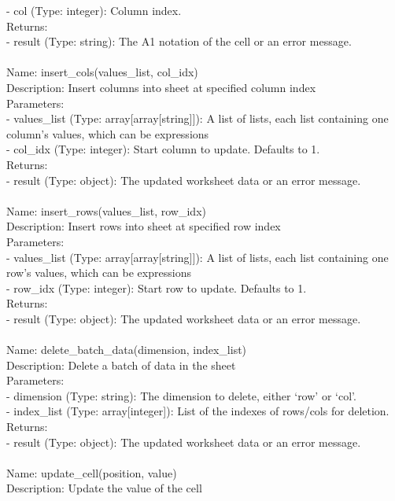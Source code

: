 \begin{tcolorbox}[breakable,title=Prompt Details for Sheet]
- col (Type: integer): Column index.\\
Returns:\\
- result (Type: string): The A1 notation of the cell or an error message.\\
\\
Name: insert\_cols(values\_list, col\_idx)\\
Description: Insert columns into sheet at specified column index\\
Parameters:\\
- values\_list (Type: array[array[string]]): A list of lists, each list containing one column's values, which can be expressions\\
- col\_idx (Type: integer): Start column to update. Defaults to 1.\\
Returns:\\
- result (Type: object): The updated worksheet data or an error message.\\
\\
Name: insert\_rows(values\_list, row\_idx)\\
Description: Insert rows into sheet at specified row index\\
Parameters:\\
- values\_list (Type: array[array[string]]): A list of lists, each list containing one row's values, which can be expressions\\
- row\_idx (Type: integer): Start row to update. Defaults to 1.\\
Returns:\\
- result (Type: object): The updated worksheet data or an error message.\\
\\
Name: delete\_batch\_data(dimension, index\_list)\\
Description: Delete a batch of data in the sheet\\
Parameters:\\
- dimension (Type: string): The dimension to delete, either `row' or `col'.\\
- index\_list (Type: array[integer]): List of the indexes of rows/cols for deletion.\\
Returns:\\
- result (Type: object): The updated worksheet data or an error message.\\
\\
Name: update\_cell(position, value)\\
Description: Update the value of the cell\\

\end{tcolorbox}
